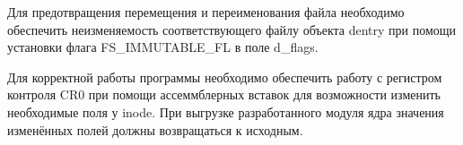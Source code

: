 Для предотвращения перемещения и переименования файла необходимо обеспечить неизменяемость соответствующего файлу объекта dentry при помощи установки флага FS\_IMMUTABLE\_FL в поле d\_flags.

Для корректной работы программы необходимо обеспечить работу с регистром контроля CR0 при помощи ассеммблерных вставок для возможности изменить необходимые поля у inode. При выгрузке разработанного модуля ядра значения изменённых полей должны возвращаться к исходным.

